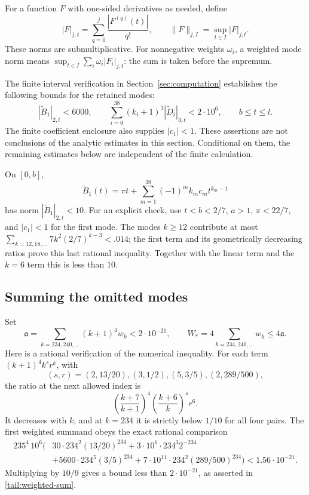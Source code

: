 For a function $F$ with one-sided derivatives as needed, define
\[
 |F|_{j,t}=\sum_{q=0}^j\frac{|F^{(q)}(t)|}{q!},
 \qquad
 \|F\|_{j,I}=\sup_{t\in I}|F|_{j,t}.
\]
These norms are submultiplicative.  For nonnegative weights
$\omega_i$, a weighted mode norm means
$\sup_{t\in I}\sum_i\omega_i|F_i|_{j,t}$:
the sum is taken before the supremum.

The finite interval verification in Section~\ref{sec:computation}
establishes the following bounds for the retained modes:
\begin{equation}
 |\widetilde B_1|_{2,t}<6000,
 \qquad
 \sum_{i=0}^{38}(k_i+1)^3|\widetilde D_i|_{3,t}<2\cdot10^6,
 \qquad b\leq t\leq l.
 \label{tail:finite-core-premise}
\end{equation}
The finite coefficient enclosure also supplies $|c_1|<1$.
These assertions are not conclusions of the analytic estimates in
this section.  Conditional on them, the remaining estimates below
are independent of the finite calculation.

On $[0,b]$,
\[
 \widetilde B_1(t)=\pi t+
       \sum_{m=1}^{38}(-1)^m k_mc_mt^{k_m-1}
\]
has norm $|\widetilde B_1|_{2,t}<10$.  For an explicit check, use
$t<b<2/7$, $a>1$, $\pi<22/7$, and $|c_1|<1$ for the first mode.
The modes $k\geq12$ contribute at most
$\sum_{k=12,18,\ldots}7k^2(2/7)^{k-3}<.014$;
the first term and its geometrically decreasing ratios prove this
last rational inequality.  Together with the linear term and the
$k=6$ term this is less than $10$.

\subsection{Summing the omitted modes}
\label{tail:sum}

Set
\begin{equation}
 \mathfrak a=\sum_{k=234,240,\ldots}(k+1)^4w_k
       <2\cdot10^{-21},\qquad
 W_*=4\sum_{k=234,240,\ldots}w_k\leq4\mathfrak a.
 \label{tail:weighted-sum}
\end{equation}
Here is a rational verification of the numerical inequality.  For
each term $(k+1)^4k^sr^k$, with
\[
 (s,r)=(2,13/20),(3,1/2),(5,3/5),(2,289/500),
\]
the ratio at the next allowed index is
\[
 \left(\frac{k+7}{k+1}\right)^4
 \left(\frac{k+6}{k}\right)^s r^6.
\]
It decreases with $k$, and at $k=234$ it is strictly below $1/10$
for all four pairs.  The first weighted summand obeys the exact
rational comparison
\[
 \begin{split}
 235^4\,10^6\bigl(&30\cdot234^2(13/20)^{234}
 +3\cdot10^6\cdot234^3 2^{-234}\\
 &+5600\cdot234^5(3/5)^{234}
 +7\cdot10^{11}\cdot234^2(289/500)^{234}\bigr)
 <1.56\cdot10^{-21}.
 \end{split}
\]
Multiplying by $10/9$ gives a bound less than
$2\cdot10^{-21}$, as asserted in \eqref{tail:weighted-sum}.


